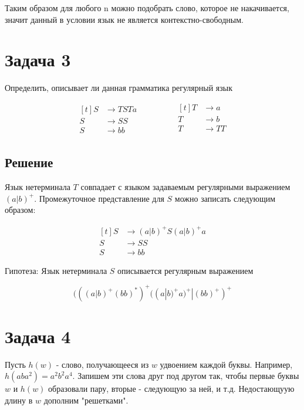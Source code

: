 \documentclass[a4paper, 14pt]{article}
\begin{document}
Таким образом для любого n можно подобрать слово, которое не накачивается, значит данный в условии язык не является контекстно-свободным.


\section{Задача 3}

Определить, описывает ли данная грамматика регулярный язык 

\begin{equation*}
	\begin{aligned}[t]
		S &\rightarrow TSTa\\  
		S &\rightarrow SS\\
		S &\rightarrow bb
	\end{aligned}
	\qquad \ \qquad
	\begin{aligned}[t]
		T &\rightarrow a\\
		T &\rightarrow b\\
		T &\rightarrow TT\\
	\end{aligned}
\end{equation*}

\newpage

\subsection{Решение}

Язык нетерминала $T$ совпадает с языком задаваемым регулярными выражением $(a|b)^{+}$.
Промежуточное представление для $S$ можно записать следующим образом:

\begin{equation*}
	\begin{aligned}[t]
		S &\rightarrow (a|b)^{+}S(a|b)^{+}a\\  
		S &\rightarrow SS\\
		S &\rightarrow bb
	\end{aligned}
\end{equation*}


Гипотеза: Язык нетерминала $S$ описывается регулярным выражением

$$(((a|b)^{+}(bb)^{*})^{+}((a|b)^{+}a)^{+} | (bb)^{+})^{+}$$

\section{Задача 4}

Пусть $h(w)$ - слово, получающееся из $w$ удвоением каждой буквы. Например, $h(aba^2) = a^{2}b^{2}a^{4}$. Запишем эти слова друг под другом так, чтобы первые буквы $w$ и $h(w)$ образовали пару, вторые - следующую за ней, и т.д. Недостающуую длину в $w$ дополним "решетками".
\end{document}

